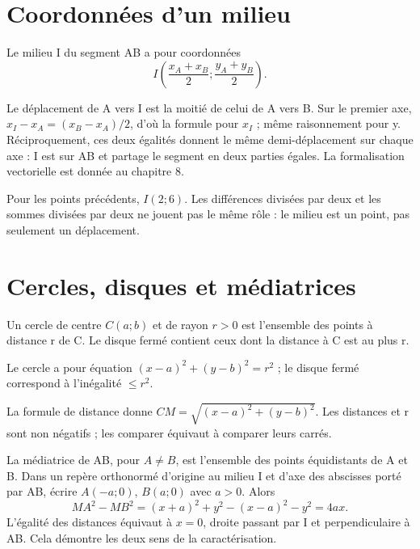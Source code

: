 \documentclass[../cours_2de.tex]{subfiles}
\begin{document}
\section{Coordonnées d'un milieu}
\begin{propriete}
Le milieu I du segment AB a pour coordonnées
\[
I\left(\frac{x_A+x_B}{2};\frac{y_A+y_B}{2}\right).
\]
\end{propriete}
\begin{demonstration}
Le déplacement de A vers I est la moitié de celui de A vers B. Sur le premier axe, $x_I-x_A=(x_B-x_A)/2$, d'où la formule pour $x_I$ ; même raisonnement pour y. Réciproquement, ces deux égalités donnent le même demi-déplacement sur chaque axe : I est sur AB et partage le segment en deux parties égales. La formalisation vectorielle est donnée au chapitre 8.
\end{demonstration}
Pour les points précédents, $I(2;6)$. Les différences divisées par deux et les sommes divisées par deux ne jouent pas le même rôle : le milieu est un point, pas seulement un déplacement.
\section{Cercles, disques et médiatrices}
Un cercle de centre $C(a;b)$ et de rayon $r>0$ est l'ensemble des points à distance r de C. Le disque fermé contient ceux dont la distance à C est au plus r.
\begin{propriete}
Le cercle a pour équation $(x-a)^2+(y-b)^2=r^2$ ; le disque fermé correspond à l'inégalité $\le r^2$.
\end{propriete}
\begin{demonstration}
La formule de distance donne $CM=\sqrt{(x-a)^2+(y-b)^2}$. Les distances et r sont non négatifs ; les comparer équivaut à comparer leurs carrés.
\end{demonstration}
La médiatrice de AB, pour $A\ne B$, est l'ensemble des points équidistants de A et B. Dans un repère orthonormé d'origine au milieu I et d'axe des abscisses porté par AB, écrire $A(-a;0)$, $B(a;0)$ avec $a>0$. Alors
\[
MA^2-MB^2=(x+a)^2+y^2-(x-a)^2-y^2=4ax.
\]
L'égalité des distances équivaut à $x=0$, droite passant par I et perpendiculaire à AB. Cela démontre les deux sens de la caractérisation.
\end{document}

